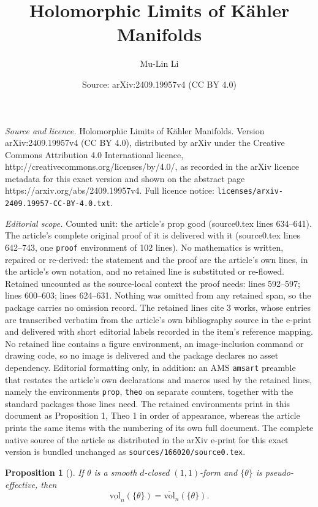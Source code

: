 \documentclass[10pt,a4paper]{amsart}
\title{Holomorphic Limits of K\"ahler Manifolds}
\author{Mu-Lin Li}
\date{Source: arXiv:2409.19957v4 (CC BY 4.0)}
\newtheorem{prop}{Proposition}
\def\beq{\begin{equation}}
\def\eeq{\end{equation}}
\begin{document}
\maketitle

\noindent\emph{Source and licence.} Holomorphic Limits of K\"ahler Manifolds. Version arXiv:2409.19957v4 (CC BY 4.0), distributed by arXiv under the Creative Commons Attribution 4.0 International licence, http://creativecommons.org/licenses/by/4.0/, as recorded in the arXiv licence metadata for this exact version and shown on the abstract page https://arxiv.org/abs/2409.19957v4. Full licence notice: \texttt{licenses/arxiv-2409.19957-CC-BY-4.0.txt}.\par\smallskip

\noindent\textit{Editorial scope.} Counted unit: the article's prop good (source0.tex lines 634--641). The article's complete original proof of it is delivered with it (source0.tex lines 642--743, one \texttt{proof} environment of 102 lines). No mathematics is written, repaired or re-derived: the statement and the proof are the article's own lines, in the article's own notation, and no retained line is substituted or re-flowed.  Retained uncounted as the source-local context the proof needs: lines 592--597; lines 600--603; lines 624--631.  Nothing was omitted from any retained span, so the package carries no omission record.  The retained lines cite 3 works, whose entries are transcribed verbatim from the article's own bibliography source in the e-print and delivered with short editorial labels recorded in the item's reference mapping.  No retained line contains a figure environment, an image-inclusion command or drawing code, so no image is delivered and the package declares no asset dependency.  Editorial formatting only, in addition: an AMS \texttt{amsart} preamble that restates the article's own declarations and macros used by the retained lines, namely the environments \texttt{prop}, \texttt{theo} on separate counters, together with the standard packages those lines need.  The retained environments print in this document as Proposition 1, Theo 1 in order of appearance, whereas the article prints the same items with the numbering of its own full document.  The complete native source of the article as distributed in the arXiv e-print for this exact version is bundled unchanged as \texttt{sources/166020/source0.tex}.
\begin{prop}[{\cite[Proposition 3.16]{BGL}}]\label{equal}
If $\theta$ is a smooth $d$-closed $(1,1)$-form and $\{\theta\}$ is pseudo-effective, then
\beq
\underline{\mathrm{vol}}_n(\{\theta\})=\overline{\mathrm{vol}}_n(\{\theta\}).\nonumber
\eeq
\end{prop}
\end{document}
